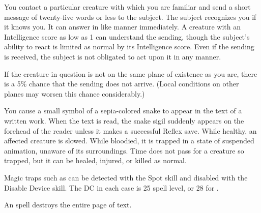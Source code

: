\begin{spelleffect}
You contact a particular creature with which you are familiar and send a short message of twenty-five words or less to the subject. The subject recognizes you if it knows you. It can answer in like manner immediately. A creature with an Intelligence score as low as 1 can understand the sending, though the subject's ability to react is limited as normal by its Intelligence score. Even if the sending is received, the subject is not obligated to act upon it in any manner.
\par If the creature in question is not on the same plane of existence as you are, there is a 5\% chance that the sending does not arrive. (Local conditions on other planes may worsen this chance considerably.)
\end{spelleffect}

\begin{spelleffect}
You cause a small symbol of a sepia-colored snake to appear in the text of a written work. When the text is read, the snake sigil suddenly appears on the forehead of the reader unless it makes a successful Reflex save. While healthy, an affected creature is slowed. While bloodied, it is trapped in a state of suspended animation, unaware of its surroundings. Time does not pass for a creature so trapped, but it can be healed, injured, or killed as normal.
\end{spelleffect}
\begin{spellnotes}
Magic traps such as  can be detected with the Spot skill and disabled with the Disable Device skill. The DC in each case is 25 \add spell level, or 28 for .

An  spell destroys the entire page of text.
\end{spellnotes}

